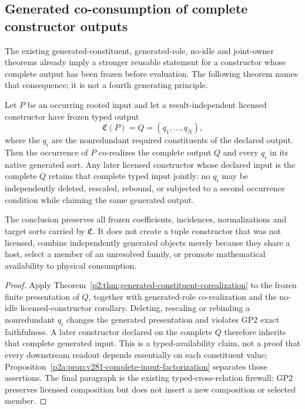 \documentclass[12pt,a4paper]{article}
\begin{document}
\subsection{Generated co-consumption of complete constructor outputs}
\label{p2a:sec:v3101-generated-coconsumption}

The existing generated-constituent, generated-role, no-idle and joint-owner
theorems already imply a stronger reusable statement for a constructor whose
complete output has been frozen before evaluation.  The following theorem
names that consequence; it is not a fourth generating principle.

\begin{theorem}
\label{p2a:thm:v3101-generated-coconsumption}
Let $P$ be an occurring rooted input and let a result-independent licensed
constructor have frozen typed output
\[
 \mathfrak C(P)=Q=(q_1,\ldots,q_N),
\]
where the $q_i$ are the nonredundant required constituents of the declared
output.  Then the occurrence of $P$ co-realizes the complete output $Q$ and
every $q_i$ in its native generated sort.  Any later licensed constructor
whose declared input is the complete $Q$ retains that complete typed input jointly:
no $q_i$ may be independently deleted, rescaled, rebound, or subjected to a
second occurrence condition while claiming the same generated output.

The conclusion preserves all frozen coefficients, incidences,
normalizations and target sorts carried by $\mathfrak C$.  It does not create
a tuple constructor that was not licensed, combine independently generated
objects merely because they share a host, select a member of an unresolved
family, or promote mathematical availability to physical consumption.
\end{theorem}

\begin{proof}
Apply Theorem~\ref{p2:thm:generated-constituent-corealization} to the frozen
finite presentation of $Q$, together with generated-role co-realization and
the no-idle licensed-constructor corollary.  Deleting, rescaling or rebinding a
nonredundant $q_i$ changes the generated presentation and violates GP2 exact
faithfulness.  A later constructor declared on the complete $Q$ therefore
inherits that complete generated input.  This is a typed-availability
claim, not a proof that every downstream readout depends essentially on
each constituent value; Proposition~\ref{p2a:prop:v281-complete-input-factorization}
separates those assertions.  The final paragraph is the existing
typed-cross-relation firewall: GP2 preserves licensed composition but does not
insert a new composition or selected member.
\end{proof}
\end{document}
